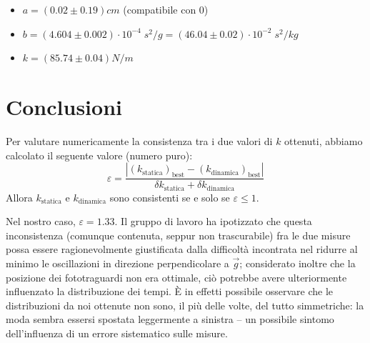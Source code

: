 \documentclass{article}
\begin{document}
\begin{itemize}
    \item $a = \left(0.02\pm0.19\right)\unit{cm}$ (compatibile con 0)
    \item $
        b = \left(4.604\pm0.002\right)\cdot10^{-4}\;\unit{s^2\per g}
          = \left(46.04\pm0.02\right)\cdot10^{-2}\;\unit{s^2\per kg}
    $
    \item $k = \left(85.74\pm0.04\right)\unit{N\per m}$
\end{itemize}


\section{Conclusioni}
Per valutare numericamente la consistenza tra i due valori di $k$ ottenuti,
abbiamo calcolato il seguente valore (numero puro):
\[
    \varepsilon =
    \frac{
        \left|\left(k_\text{statica}\right)_\text{best} - \left(k_\text{dinamica}\right)_\text{best}\right|
    }{
        \delta k_\text{statica} + \delta k_\text{dinamica}
    }
\]
Allora $k_\text{statica}$ e $k_\text{dinamica}$ sono consistenti se e solo se $\varepsilon \le 1$.

Nel nostro caso, $\varepsilon = 1.33$. Il gruppo di lavoro ha ipotizzato che
questa inconsistenza (comunque contenuta, seppur non trascurabile) fra le due
misure possa essere ragionevolmente giustificata dalla difficoltà incontrata
nel ridurre al minimo le oscillazioni in direzione perpendicolare a $\vec{g}$;
considerato inoltre che la posizione dei fototraguardi non era ottimale, ciò
potrebbe avere ulteriormente influenzato la distribuzione dei tempi. È in
effetti possibile osservare che le distribuzioni da noi ottenute non sono,
il più delle volte, del tutto simmetriche: la moda sembra essersi spostata
leggermente a sinistra – un possibile sintomo dell'influenza di un
errore sistematico sulle misure.
\end{document}
